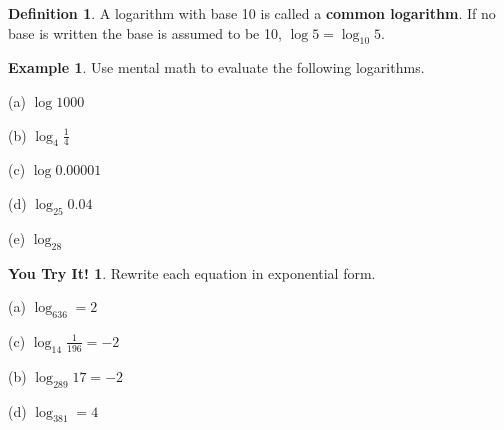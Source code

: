 \documentclass{report}
\theoremstyle{definition}
\newtheorem{example}{\bf Example}
\newtheorem{youtry}{\bf You Try It!}
\newtheorem{definition}{\bf Definition}[section]
\begin{document}
\vfill

 \newpage
 
 \begin{definition}
 A logarithm with base 10 is called a \textbf{common logarithm}. If no base is written the base is assumed to be 10, $\log 5 =\log_{10}5$.
 \end{definition}
 
 \vspace{1cm}
 
 \begin{example}
Use mental math to evaluate the following logarithms.
 \end{example}
 
\begin{minipage}[t]{0.18\linewidth}
(a)  $\log1000$
\end{minipage}
 \hfill
\begin{minipage}[t]{0.18\linewidth}
(b) $\log_4\displaystyle\frac{1}{4}$
\end{minipage}
 \hfill
\begin{minipage}[t]{0.18\linewidth}
(c) $\log0.00001$
\end{minipage}
 \hfill
\begin{minipage}[t]{0.18\linewidth}
(d) $\log_{25}0.04$
\end{minipage}
 \hfill
 \begin{minipage}[t]{0.18\linewidth}
(e) $\log_28$
\end{minipage}
 \hfill

\vfill

\begin{youtry}
Rewrite each equation in exponential form.
\end{youtry}

\begin{minipage}[t]{0.45\linewidth}
(a) $\log_636=2$\\

\vspace{3cm}

(c) $\log_{14}\displaystyle\frac{1}{196}=-2$\\

\vspace{3cm}

\end{minipage}
\hfill
\begin{minipage}[t]{0.45\linewidth}
(b) $\log_{289}17=-2$\\

\vspace{3cm}

(d) $\log_381=4$\\

\vspace{3cm}
\end{minipage}
\end{document}
